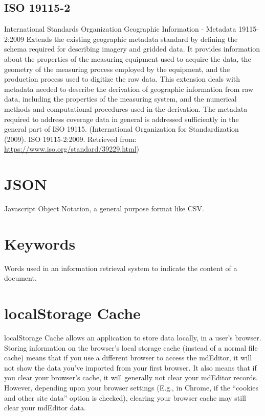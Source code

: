 \documentclass[
]{book}
\begin{document}
\hypertarget{iso-19115-2}{%
\subsection*{ISO 19115-2}\label{iso-19115-2}}

International Standards Organization Geographic Information - Metadata 19115-2:2009
Extends the existing geographic metadata standard by defining the schema required for describing imagery and gridded data. It provides information about the properties of the measuring equipment used to acquire the data, the geometry of the measuring process employed by the equipment, and the production process used to digitize the raw data. This extension deals with metadata needed to describe the derivation of geographic information from raw data, including the properties of the measuring system, and the numerical methods and computational procedures used in the derivation. The metadata required to address coverage data in general is addressed sufficiently in the general part of ISO 19115. (International Organization for Standardization (2009). ISO 19115-2:2009. Retrieved from: \url{https://www.iso.org/standard/39229.html})

\hypertarget{json}{%
\section*{JSON}\label{json}}

Javascript Object Notation, a general purpose format like CSV.

\hypertarget{keywords}{%
\section*{Keywords}\label{keywords}}

Words used in an information retrieval system to indicate the content of a document.

\hypertarget{localstorage-cache}{%
\section*{localStorage Cache}\label{localstorage-cache}}

localStorage Cache allows an application to store data locally, in a user's browser. Storing information on the browser's local storage cache (instead of a normal file cache) means that if you use a different browser to access the mdEditor, it will not show the data you've imported from your first browser. It also means that if you clear your browser's cache, it will generally not clear your mdEditor records. However, depending upon your browser settings (E.g., in Chrome, if the ``cookies and other site data'' option is checked), clearing your browser cache may still clear your mdEditor data.
\end{document}
